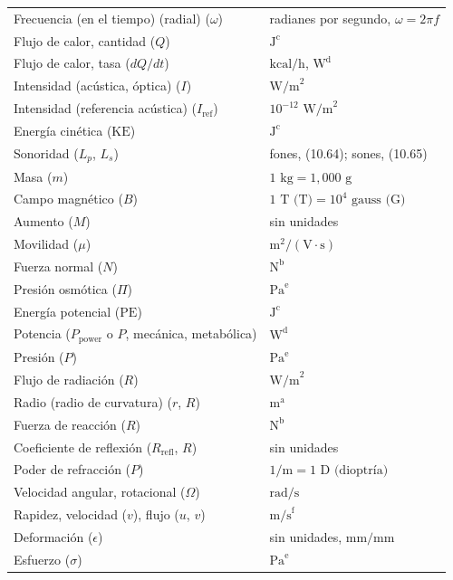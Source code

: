 \documentclass[12pt,a4paper]{book}
\begin{document}
\begin{table}[htbp]
\begin{tabularx}{\textwidth}{>{\hsize=1.0\hsize}X >{\hsize=1.0\hsize}X}
    Frecuencia (en el tiempo) (radial) ($\omega$) & radianes por segundo, $\omega = 2\pi f$ \\
    Flujo de calor, cantidad ($Q$) & $\text{J}^{\text{c}}$ \\
    Flujo de calor, tasa ($dQ/dt$) & $\text{kcal/h}$, $\text{W}^{\text{d}}$ \\
    Intensidad (acústica, óptica) ($I$) & $\text{W/m}^2$ \\
    Intensidad (referencia acústica) ($I_{\text{ref}}$) & $10^{-12}\text{ W/m}^2$ \\
    Energía cinética ($\text{KE}$) & $\text{J}^{\text{c}}$ \\
    Sonoridad ($L_p$, $L_s$) & fones, (10.64); sones, (10.65) \\
    Masa ($m$) & $1\text{ kg} = 1,000\text{ g}$ \\
    Campo magnético ($B$) & $1\text{ T (T)} = 10^4\text{ gauss (G)}$ \\
    Aumento ($M$) & sin unidades \\
    Movilidad ($\mu$) & $\text{m}^2/(\text{V}\cdot\text{s})$ \\
    Fuerza normal ($N$) & $\text{N}^{\text{b}}$ \\
    Presión osmótica ($\Pi$) & $\text{Pa}^{\text{e}}$ \\
    Energía potencial ($\text{PE}$) & $\text{J}^{\text{c}}$ \\
    Potencia ($P_{\text{power}}$ o $P$, mecánica, metabólica) & $\text{W}^{\text{d}}$ \\
    Presión ($P$) & $\text{Pa}^{\text{e}}$ \\
    Flujo de radiación ($R$) & $\text{W/m}^2$ \\
    Radio (radio de curvatura) ($r$, $R$) & $\text{m}^{\text{a}}$ \\
    Fuerza de reacción ($R$) & $\text{N}^{\text{b}}$ \\
    Coeficiente de reflexión ($R_{\text{refl}}$, $R$) & sin unidades \\
    Poder de refracción ($P$) & $1/\text{m} = 1\text{ D (dioptría)}$ \\
    Velocidad angular, rotacional ($\Omega$) & $\text{rad/s}$ \\
    Rapidez, velocidad ($v$), flujo ($u$, $v$) & $\text{m/s}^{\text{f}}$ \\
    Deformación ($\epsilon$) & sin unidades, $\text{mm/mm}$ \\
    Esfuerzo ($\sigma$) & $\text{Pa}^{\text{e}}$ \\

\end{tabularx}
\end{table}
\end{document}
